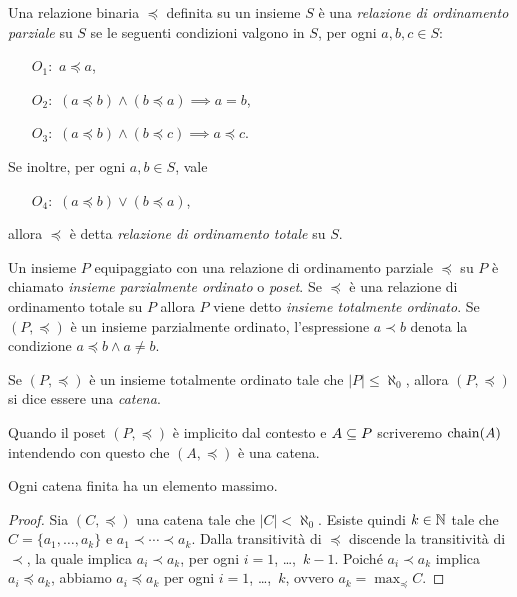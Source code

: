 \begin{definizione}  
Una relazione binaria $\preceq$ definita su un insieme
$S$ \`e una \emph{relazione di ordinamento parziale} su $S$
se le seguenti condizioni valgono in $S$,
per ogni $a, b, c \in S$:
\begin{itemize}
\item[$O_1:$] $a \preceq a$,
\item[$O_2:$] $(a \preceq b) \land (b \preceq a) \implies a = b$,
\item[$O_3:$] $(a \preceq b) \land (b \preceq c) \implies a \preceq c$.
\end{itemize}
Se inoltre, per ogni $a, b \in S$, vale
\begin{itemize}
\item[$O_4:$] $(a \preceq b) \lor (b \preceq a)$,
\end{itemize}
allora $\preceq$ \`e detta \emph{relazione di ordinamento totale} su $S$.
\end{definizione}

\begin{definizione} 
Un insieme $P$ equipaggiato con una relazione di ordinamento
parziale $\preceq$ su $P$ \`e chiamato
\emph{insieme parzialmente ordinato} o \emph{poset}.
Se $\preceq$ \`e una relazione di
ordinamento totale su $P$ allora $P$ viene detto
\emph{insieme totalmente ordinato}.
Se $(P, \preceq)$ \`e un insieme parzialmente ordinato,
l'espressione $a \prec b$ denota
la condizione $a \preceq b \land a \neq b$.
\end{definizione}

\begin{definizione} 
Se $(P, \preceq)$ \`e un insieme totalmente ordinato
tale che $|P| \leq \aleph _0$, allora $(P, \preceq)$ si dice essere una
\emph{catena}.
\end{definizione}

Quando il poset $(P, \preceq)$ \`e implicito dal contesto
e $A \subseteq P$ scriveremo $\mathop{\mathrm{chain}}\nolimits(A)$ intendendo con questo
che $(A, \preceq)$ \`e una catena.

\begin{proposizione}
Ogni catena finita ha un elemento massimo.
\end{proposizione}
\begin{proof}
Sia $(C, \preceq)$ una catena tale che $|C| < \aleph_0$.
Esiste quindi $k \in \mathbb{N}$ tale che $C = \{ a_1, \dots, a_k \}$
e $a_1 \prec \cdots \prec a_k$.
Dalla transitivit\`a di $\preceq$ discende la transitivit\`a di $\prec$,
la quale implica $a_i \prec a_k$, per ogni $i = 1$, \dots,~$k-1$.
Poich\'e $a_i \prec a_k$ implica $a_i \preceq a_k$, abbiamo
$a_i \preceq a_k$ per ogni $i = 1$, \dots,~$k$, ovvero $a_k = \max_\preceq C$.
\end{proof}


